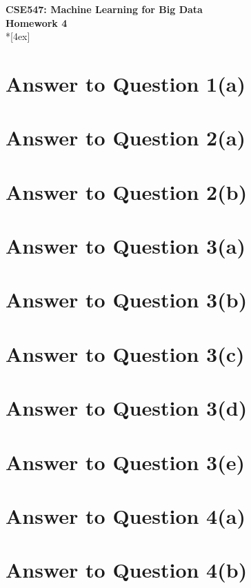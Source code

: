 \documentclass[11pt]{article}
\begin{document}
\thispagestyle{empty}
\parindent 0pt
\vfill
\large

\begin{center}
\LARGE{\bf \textsf{CSE547: Machine Learning for Big Data}}\\ {\bf \textsf{Homework 4}} 
\\*[4ex]
\end{center}

\section*{Answer to Question 1(a)}

\pagebreak[4]
\section*{Answer to Question 2(a)}

\pagebreak[4]
\section*{Answer to Question 2(b)}

\pagebreak[4]
\section*{Answer to Question 3(a)}

\pagebreak[4]
\section*{Answer to Question 3(b)}

\pagebreak[4]
\section*{Answer to Question 3(c)}

\pagebreak[4]
\section*{Answer to Question 3(d)}

\pagebreak[4]
\section*{Answer to Question 3(e)}

\pagebreak[4]
\section*{Answer to Question 4(a)}

\pagebreak[4]
\section*{Answer to Question 4(b)}

\pagebreak[4]
\end{document}
